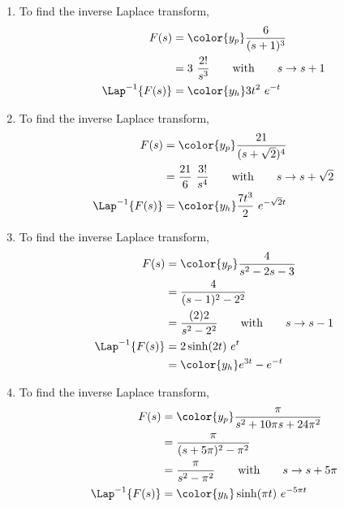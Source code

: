 \begin{enumerate}
    \item To find the inverse Laplace transform,
          \begin{align}
              F(s)              & = \color{y_p} \frac{6}{(s+1)^3} \\
                                & = 3\ \frac{2!}{s^3}
              \qquad \text{with} \qquad s \to s+1                 \\
              \Lap^{-1}\{F(s)\} & = \color{y_h} 3t^2\ e^{-t}
          \end{align}

    \item To find the inverse Laplace transform,
          \begin{align}
              F(s)              & = \color{y_p} \frac{21}{(s+\sqrt{2})^4}      \\
                                & = \frac{21}{6}\ \frac{3!}{s^4}
              \qquad \text{with} \qquad s \to s+\sqrt{2}                       \\
              \Lap^{-1}\{F(s)\} & = \color{y_h} \frac{7t^3}{2}\ e^{-\sqrt{2}t}
          \end{align}

    \item To find the inverse Laplace transform,
          \begin{align}
              F(s)              & = \color{y_p} \frac{4}{s^2 - 2s - 3} \\
                                & = \frac{4}{(s-1)^2 - 2^2}            \\
                                & = \frac{(2)2}{s^2 - 2^2}
              \qquad \text{with} \qquad s \to s-1                      \\
              \Lap^{-1}\{F(s)\} & = 2\sinh(2t)\ e^{t}                  \\
                                & = \color{y_h} e^{3t} - e^{-t}
          \end{align}

    \item To find the inverse Laplace transform,
          \begin{align}
              F(s)              & = \color{y_p} \frac{\pi}
              {s^2 + 10\pi s + 24\pi^2}                                    \\
                                & = \frac{\pi}{(s+5\pi)^2 - \pi^2}         \\
                                & = \frac{\pi}{s^2 - \pi^2}
              \qquad \text{with} \qquad s \to s+5\pi                       \\
              \Lap^{-1}\{F(s)\} & =  \color{y_h} \sinh(\pi t)\ e^{-5\pi t}
          \end{align}


\end{enumerate}
